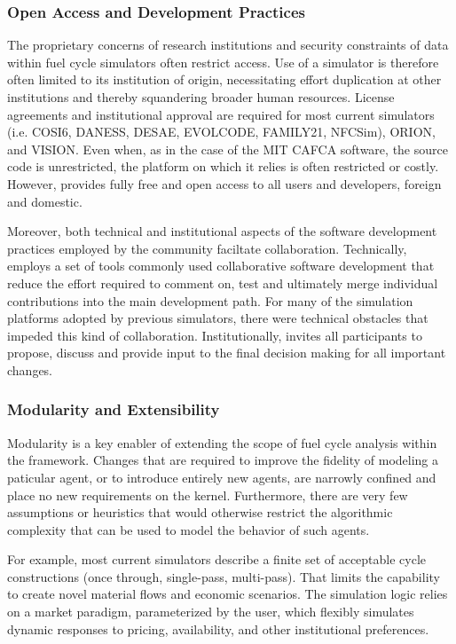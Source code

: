 
\subsubsection{Open Access and Development Practices}

The proprietary concerns of research institutions and security constraints of
data within fuel cycle simulators often restrict access. Use of a simulator is
therefore often limited to its institution of origin, necessitating effort
duplication at other institutions and thereby squandering broader human
resources. License agreements and institutional approval are required for most
current simulators (i.e. \gls{COSI}6, \gls{DANESS}, \gls{DESAE}, EVOLCODE,
FAMILY21, \gls{NFCSim})\cite{juchau_modeling_2010}, ORION, and VISION.  Even when, as in
the case of the MIT \gls{CAFCA} software, the source code is unrestricted, the
platform on which it relies is often restricted or costly.  However, \Cyclus
provides fully free and open access to all users
and developers, foreign and domestic.

Moreover, both technical and institutional aspects of the software development
practices employed by the \Cyclus community faciltate collaboration.
Technically, \Cyclus employs a set of tools commonly used collaborative
software development that reduce the effort required to comment on, test and
ultimately merge individual contributions into the main development path.  
For many of the simulation platforms adopted by previous simulators, there were
technical obstacles that impeded this kind of collaboration.
Institutionally, \Cyclus invites all participants to propose, discuss and
provide input to the final decision making for all important changes.

\subsubsection{Modularity and Extensibility}

Modularity is a key enabler of extending the scope of fuel cycle analysis
within the \Cyclus framework.  Changes that are required to improve the
fidelity of modeling a paticular agent, or to introduce entirely new agents,
are narrowly confined and place no new requirements on the \Cyclus kernel.
Furthermore, there are very few assumptions or heuristics that would otherwise
restrict the algorithmic complexity that can be used to model the behavior of
such agents.

For example, most current simulators describe a finite set of acceptable cycle
constructions (once through, single-pass, multi-pass). That limits the
capability to create novel material flows and economic scenarios. The \Cyclus
simulation logic relies on a market paradigm, parameterized by the user, which
flexibly simulates dynamic responses to pricing, availability, and other
institutional preferences.  

